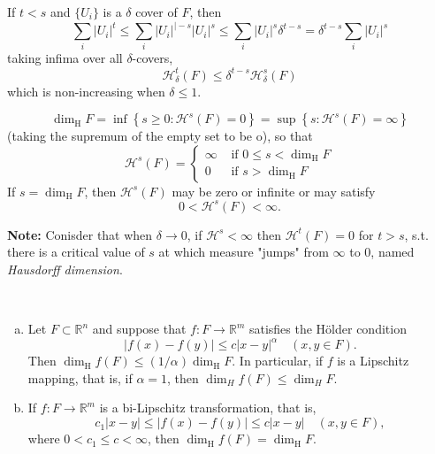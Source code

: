 \begin{property}
    If $t<s$ and $\{U_i\}$ is a $\delta$ cover of $F$, then
    $$
    \sum_{i}\left|U_{i}\right|^{t} \leq \sum_{i}\left|U_{i}\right|^{\mid-s}\left|U_{i}\right|^{s} \leq  \sum_{i}\left|U_{i}\right|^{s}\delta^{t-s} = \delta^{t-s} \sum_{i}\left|U_{i}\right|^{s}
    $$
    taking infima over all $\delta$-covers,
    $$
    \mathcal{H}^t_\delta(F)\leq \delta^{t-s}\mathcal{H}^s_\delta(F)
    $$
    which is non-increasing when $\delta\leq 1$.
\end{property}

\begin{definition}
    $$\operatorname{dim}_{\mathrm{H}} F=\inf \left\{s \geq 0: \mathcal{H}^{s}(F)=0\right\}=\sup \left\{s: \mathcal{H}^{s}(F)=\infty\right\}$$
(taking the supremum of the empty set to be o), so that
$$
\mathcal{H}^{s}(F)=\left\{\begin{array}{ll}
\infty & \text { if } 0 \leq s<\operatorname{dim}_{\mathrm{H}} F \\
0 & \text { if } s>\operatorname{dim}_{\mathrm{H}} F
\end{array}\right.
$$
If $s=\operatorname{dim}_{\mathrm{H}} F$, then $\mathcal{H}^{s}(F)$ may be zero or infinite or may satisfy
$$
0<\mathcal{H}^{s}(F)<\infty .
$$
\end{definition}

\textbf{Note: }Conisder that when $\delta\rightarrow 0$, if $\mathcal{H}^s<\infty$ then $\mathcal{H}^t(F) = 0$ for $t>s$, s.t. there is a critical value of $s$ at which measure "jumps" from $\infty$ to $0$, named \textit{Hausdorff dimension}.



\begin{proposition}\label{H-under-L} $ $
    \begin{enumerate}[a.]
        \item Let $F \subset \mathbb{R}^{n}$ and suppose that $f: F \rightarrow \mathbb{R}^{m}$ satisfies the Hölder condition
$$
|f(x)-f(y)| \leq c|x-y|^{\alpha} \quad(x, y \in F) .
$$
Then $\operatorname{dim}_{\mathrm{H}} f(F) \leq(1 / \alpha) \operatorname{dim}_{\mathrm{H}} F .$ In particular, if $f$ is a Lipschitz
mapping, that is, if $\alpha=1$, then $\operatorname{dim}_{H} f(F) \leq \operatorname{dim}_{H} F$.
\item If $f: F \rightarrow \mathbb{R}^{m}$ is a bi-Lipschitz transformation, that is,
$$
c_{1}|x-y| \leq|f(x)-f(y)| \leq c|x-y| \quad(x, y \in F),
$$
where $0<c_{1} \leq c<\infty$, then $\operatorname{dim}_{\mathrm{H}} f(F)=\operatorname{dim}_{\mathrm{H}} F$.
    \end{enumerate}
\end{proposition}

